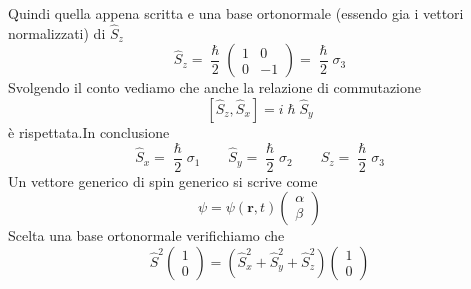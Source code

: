 Quindi quella appena scritta e una base
ortonormale (essendo gia i vettori normalizzati) di \(\hat{S}_{z}\) \[
                                                                        \hat{S}_{z} = \frac{\hslash}{2}
                                                                        \begin{pmatrix}
                                                                            1 & 0  \\
                                                                            0 & -1
                                                                        \end{pmatrix} = \frac{\hslash}{2} \sigma_{3}
\] Svolgendo il conto vediamo che anche la relazione di commutazione \[
                                                                         [ \hat{S}_{z}, \hat{S}_{x}] = i \hslash \hat{S}_{y}
\] è rispettata.In conclusione \[
                                   \hat{S}_{x} = \frac{\hslash}{2} \sigma_{1} \qquad
                                   \hat{S}_{y} =  \frac{\hslash}{2} \sigma_{2} \qquad
                                   \hat{S}_{z} = \frac{\hslash}{2} \sigma_{3}
\] Un vettore generico di spin generico si scrive come \[
                                                           \psi = \psi (\bm{r},t) \begin{pmatrix}
                                                                                      \alpha  \\
                                                                                      \beta
                                                           \end{pmatrix}
\] Scelta una base ortonormale verifichiamo che \[
                                                    \hat{S}^{2}
                                                    \begin{pmatrix}
                                                        1  \\
                                                        0
                                                    \end{pmatrix}
                                                    = (\hat{S}_{x}^{2} + \hat{S}_{y}^{2}+\hat{S}_{z}^{2})\begin{pmatrix}
                                                                                                             1 \\
                                                                                                             0

\end{pmatrix}\]
